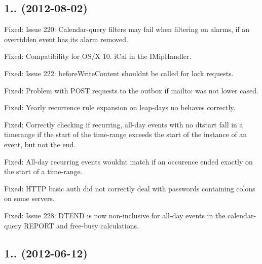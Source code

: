 \subsection*{1.. (2012-\/08-\/02) }


\begin{DoxyItemize}
\item Fixed\+: Issue 220\+: Calendar-\/query filters may fail when filtering on alarms, if an overridden event has it\textquotesingle{}s alarm removed.
\item Fixed\+: Compatibility for O\+S/X 10. i\+Cal in the I\+Mip\+Handler.
\item Fixed\+: Issue 222\+: before\+Write\+Content shouldn\textquotesingle{}t be called for lock requests.
\item Fixed\+: Problem with P\+O\+ST requests to the outbox if mailto\+: was not lower cased.
\item Fixed\+: Yearly recurrence rule expansion on leap-\/days no behaves correctly.
\item Fixed\+: Correctly checking if recurring, all-\/day events with no dtstart fall in a timerange if the start of the time-\/range exceeds the start of the instance of an event, but not the end.
\item Fixed\+: All-\/day recurring events wouldn\textquotesingle{}t match if an occurence ended exactly on the start of a time-\/range.
\item Fixed\+: H\+T\+TP basic auth did not correctly deal with passwords containing colons on some servers.
\item Fixed\+: Issue 228\+: D\+T\+E\+ND is now non-\/inclusive for all-\/day events in the calendar-\/query R\+E\+P\+O\+RT and free-\/busy calculations.
\end{DoxyItemize}

\subsection*{1.. (2012-\/06-\/12) }


